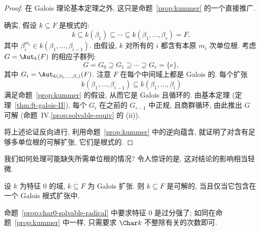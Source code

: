 \begin{proof}
在 Galois 理论基本定理之外, 这只是命题~\ref{prop:kummer} 的一个直接推广.

确实, 假设 $k\subseteq F$ 是根式的:
\[
k\subseteq k(\beta_1)\subseteq\cdots\subseteq k(\beta_1,\ldots,\beta_r)=F,
\]
其中 $\beta_i^{m_i}\in k(\beta_1,\ldots,\beta_{i-1})$. 由假设, $k$ 对所有的 $i$ 都含有本原 $m_i$ 次单位根. 考虑 $G=\Aut_k(F)$ 的相应子群列:
\[
G=G_0\supseteq G_1\supseteq\cdots\supseteq G_r=\{e\},
\]
其中 $G_i=\Aut_{k(\beta_1,\ldots,\beta_i)}(F)$. 注意 $F$ 在每个中间域上都是 Galois 的. 每个扩张
\[
k(\beta_1,\ldots,\beta_{i-1})\subseteq k(\beta_1,\ldots,\beta_i)
\]
满足命题~\ref{prop:kummer} 的假设, 从而它是 Galois 且循环的. 由基本定理 (定理~\ref{thm:ft-galois-II}), 每个 $G_i$ 在之前的 $G_{i-1}$ 中正规, 且商群循环, 由此推出 $G$ 可解 (命题~IV.\ref{prop:solvable-equiv} 的 (ii)).

将上述论证反向进行, 利用命题~\ref{prop:kummer} 中的逆向蕴含, 就证明了对含有足够多单位根的可解扩张, 它们是根式的.
\end{proof}

我们如何处理可能缺失所需单位根的情况? 令人惊讶的是, 这对结论的影响相当轻微.

\begin{proposition}\label{prop:char0-solvable-radical}
设 $k$ 为特征 $0$ 的域, $k\subseteq F$ 为 Galois 扩张. 则 $k\subseteq F$ 是可解的, 当且仅当它包含在一个 Galois 根式扩张中.
\end{proposition}

命题~\ref{prop:char0-solvable-radical} 中要求特征 $0$ 是过分强了; 如同在命题~\ref{prop:kummer} 中一样, 只需要求 $\Char k$ 不整除有关的次数即可.

